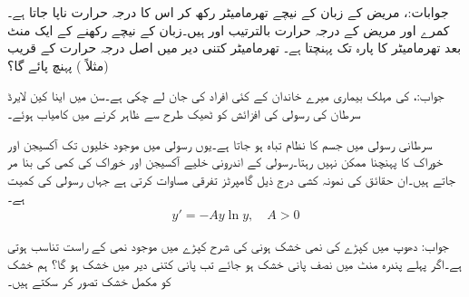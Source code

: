 جوابات:، 
مریض کے زبان کے نیچے تھرمامیٹر رکھ کر اس کا درجہ حرارت ناپا جاتا ہے۔ کمرے اور مریض کے درجہ حرارت بالترتیب  اور  ہیں۔زبان کے نیچے رکھنے کے ایک منٹ بعد تھرمامیٹر کا پارہ  تک پہنچتا ہے۔ تھرمامیٹر کتنی دیر میں اصل درجہ حرارت کے قریب (مثلاً ) پہنچ پائے گا؟

جواب:، 
 کی مہلک بیماری میرے خاندان کے کئی افراد کی جان لے چکی ہے۔سن  میں اینا کین لایرڈ سرطان کی رسولی کی افزائش کو ٹھیک طرح  سے ظاہر کرنے میں کامیاب ہوئے۔

سرطانی رسولی میں جسم کا نظام تباہ ہو جاتا ہے۔یوں رسولی میں موجود خلیوں تک آکسیجن اور خوراک کا پہنچنا ممکن نہیں رہتا۔رسولی کے اندرونی خلیے آکسیجن اور خوراک کی کمی کی بنا مر جاتے ہیں۔ان حقائق کی نمونہ کشی درج ذیل گامپرٹز تفرقی مساوات کرتی ہے جہاں  رسولی کی کمیت ہے۔
\begin{align}
y'=-Ay\ln y,\quad A>0
\end{align}

جواب:
دھوپ میں کپڑے کی نمی خشک ہونی کی شرح کپڑے میں موجود نمی کے راست تناسب ہوتی ہے۔اگر پہلے پندرہ منٹ میں نصف پانی خشک ہو جائے تب   پانی کتنی دیر میں خشک ہو گا؟ ہم   خشک کو مکمل خشک تصور کر سکتے ہیں۔

